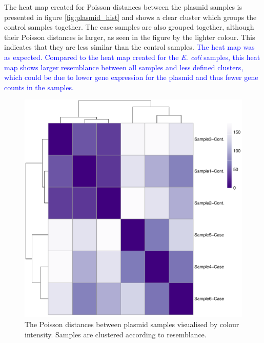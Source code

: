 The heat map created for Poisson distances between the plasmid samples is presented in figure \ref{fig:plasmid_hist} and shows a clear cluster which groups the control samples together. The case samples are also grouped together, although their Poisson distances is larger, as seen in the figure by the lighter colour. This indicates that they are less similar than the control samples. \textcolor{blue}{The heat map was as expected. Compared to the heat map created for the \textit{E. coli} samples, this heat map shows larger resemblance between all samples and less defined clusters, which could be due to lower gene expression for the plasmid and thus fewer gene counts in the samples.}
\begin{figure}[h!]
    \centering
    \includegraphics[scale=0.6]{Figures/Pois_dist_heat_plasmid.pdf}
    \caption{The Poisson distances between plasmid samples visualised by colour intensity. Samples are clustered according to resemblance.}
    \label{fig:plasmid_pois}
\end{figure}

